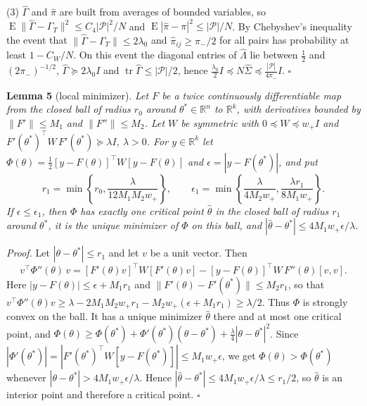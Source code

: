 (3) $\widehat\Gamma$ and $\hat\pi$ are built from averages of bounded
variables, so
$\operatorname{E}\|\widehat\Gamma-\Gamma_T\|^2\le C_4|\mathcal P|^2/N$ and
$\operatorname{E}|\hat\pi-\pi|^2\le|\mathcal P|/N$. By Chebyshev's
inequality the event that $\|\widehat\Gamma-\Gamma_T\|\le2\lambda_0$ and
$\hat\pi_{ij}\ge\pi_-/2$ for all pairs has probability at least $1-C_W/N$.
On this event the diagonal entries of $\widehat\Lambda$ lie between
$\tfrac12$ and $(2\pi_-)^{-1/2}$, $\widehat\Gamma\succeq2\lambda_0I$ and
$\operatorname{tr}\widehat\Gamma\le|\mathcal P|/2$, hence
$\tfrac{\lambda_0}2I\preceq N\widehat\Sigma\preceq
\tfrac{|\mathcal P|}{4\pi_-}I$. \hfill$\square$

\medskip
\noindent\textbf{Lemma 5} (local minimizer). \emph{Let $F$ be a twice
continuously differentiable map from the closed ball of radius $r_0$ around
$\theta^*\in\mathbb R^n$ to $\mathbb R^k$, with derivatives bounded by
$\|F'\|\le M_1$ and $\|F''\|\le M_2$. Let $W$ be symmetric with
$0\preceq W\preceq w_+I$ and
$F'(\theta^*)^{\!\top}W\,F'(\theta^*)\succeq\lambda I$, $\lambda>0$. For
$y\in\mathbb R^k$ let $\Phi(\theta)=\tfrac12[y-F(\theta)]^{\!\top}
W[y-F(\theta)]$ and $\epsilon=|y-F(\theta^*)|$, and put}
\begin{equation}
 r_1=\min\left\{r_0,\frac{\lambda}{12M_1M_2w_+}\right\},\qquad
 \epsilon_1=\min\left\{\frac{\lambda}{4M_2w_+},
 \frac{\lambda r_1}{8M_1w_+}\right\}.
 \label{conv:radii}
\end{equation}
\emph{If $\epsilon\le\epsilon_1$, then $\Phi$ has exactly one critical
point $\hat\theta$ in the closed ball of radius $r_1$ around $\theta^*$, it
is the unique minimizer of $\Phi$ on this ball, and
$|\hat\theta-\theta^*|\le4M_1w_+\epsilon/\lambda$.}

\noindent\emph{Proof.} Let $|\theta-\theta^*|\le r_1$ and let $v$ be a unit
vector. Then
\begin{equation}
 v^{\!\top}\Phi''(\theta)\,v=[F'(\theta)v]^{\!\top}W[F'(\theta)v]
 -[y-F(\theta)]^{\!\top}W\,F''(\theta)[v,v].
\end{equation}
Here $|y-F(\theta)|\le\epsilon+M_1r_1$ and
$\|F'(\theta)-F'(\theta^*)\|\le M_2r_1$, so that
$v^{\!\top}\Phi''(\theta)v\ge\lambda-2M_1M_2w_+r_1-M_2w_+(\epsilon+M_1r_1)
\ge\lambda/2$. Thus $\Phi$ is strongly convex on the ball. It has a unique
minimizer $\hat\theta$ there and at most one critical point, and
$\Phi(\theta)\ge\Phi(\theta^*)+\Phi'(\theta^*)(\theta-\theta^*)
+\tfrac\lambda4|\theta-\theta^*|^2$. Since
$|\Phi'(\theta^*)|=|F'(\theta^*)^{\!\top}W[y-F(\theta^*)]|
\le M_1w_+\epsilon$, we get $\Phi(\theta)>\Phi(\theta^*)$ whenever
$|\theta-\theta^*|>4M_1w_+\epsilon/\lambda$. Hence
$|\hat\theta-\theta^*|\le4M_1w_+\epsilon/\lambda\le r_1/2$, so $\hat\theta$
is an interior point and therefore a critical point. \hfill$\square$

